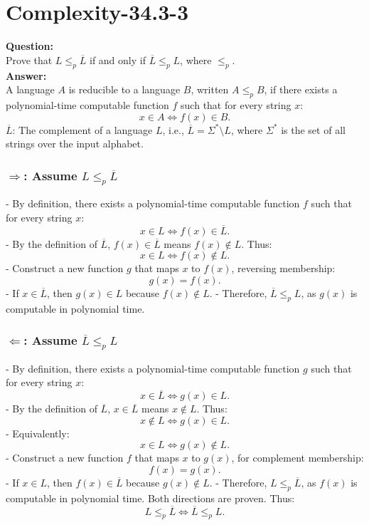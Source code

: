 \documentclass[12pt]{article}
\begin{document}
\section{Complexity-34.3-3}
\textbf{Question:}\\
Prove that \( L \leq_p \overline{L} \) if and only if \( \overline{L} \leq_p L \), where \( \leq_p \).\\
\textbf{Answer:}\\
A language \( A \) is reducible to a language \( B \), written \( A \leq_p B \), if there exists a polynomial-time computable function \( f \) such that for every string \( x \):
   \[
   x \in A \iff f(x) \in B.
   \]
\( \overline{L} \): The complement of a language \( L \), i.e., \( \overline{L} = \Sigma^* \setminus L \), where \( \Sigma^* \) is the set of all strings over the input alphabet.

\subsubsection*{\( \Rightarrow \): Assume \( L \leq_p \overline{L} \)}
- By definition, there exists a polynomial-time computable function \( f \) such that for every string \( x \):
  \[
  x \in L \iff f(x) \in \overline{L}.
  \]
- By the definition of \( \overline{L} \), \( f(x) \in \overline{L} \) means \( f(x) \notin L \). Thus:
  \[
  x \in L \iff f(x) \notin L.
  \]
- Construct a new function \( g \) that maps \( x \) to \( f(x) \), reversing membership:
  \[
  g(x) = f(x).
  \]
  - If \( x \in \overline{L} \), then \( g(x) \in L \) because \( f(x) \notin L \).
  - Therefore, \( \overline{L} \leq_p L \), as \( g(x) \) is computable in polynomial time.

\subsubsection*{\( \Leftarrow \): Assume \( \overline{L} \leq_p L \)}
- By definition, there exists a polynomial-time computable function \( g \) such that for every string \( x \):
  \[
  x \in \overline{L} \iff g(x) \in L.
  \]
- By the definition of \( \overline{L} \), \( x \in \overline{L} \) means \( x \notin L \). Thus:
  \[
  x \notin L \iff g(x) \in L.
  \]
- Equivalently:
  \[
  x \in L \iff g(x) \notin L.
  \]
- Construct a new function \( f \) that maps \( x \) to \( g(x) \), for complement membership:
  \[
  f(x) = g(x).
  \]
  - If \( x \in L \), then \( f(x) \in \overline{L} \) because \( g(x) \notin L \).
  - Therefore, \( L \leq_p \overline{L} \), as \( f(x) \) is computable in polynomial time.
Both directions are proven. Thus:
\[
L \leq_p \overline{L} \iff \overline{L} \leq_p L.
\]
\end{document}

